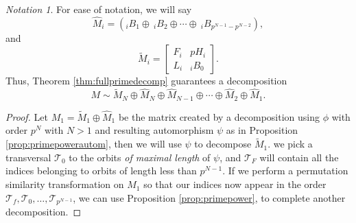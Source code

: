 \documentclass[preprint,12pt]{elsarticle}
\newcommand{\cT}{\mathcal{T}}
\newcommand{\hM}{\hat{M}}
\newcommand{\tM}{\tilde{M}}
\renewcommand{\so}{\mathscr{O}}
\theoremstyle{definition}
\theoremstyle{remark}
\newtheorem{notat}{Notation}
\newcommand{\afcomm}[1]{\textcolor{orange}{#1}}
\begin{document}
\begin{notat}
For ease of notation, we will say
\[\hM_i = \left(_iB_1 \oplus\ _iB_2 \oplus \cdots \oplus\ _iB_{p^{N-1}-p^{N-2}}\right),
\] and
\[
\tM_i =  \left[\begin{array}{rr} F_i & pH_i \\ L_i & _iB_0 \end{array}\right].
\]
Thus, Theorem \ref{thm:fullprimedecomp} guarantees a decomposition
\[
M \sim \tM_N \oplus \hM_N \oplus \hM_{N-1} \oplus \cdots \oplus \hM_2 \oplus \hM_1.
\]
\end{notat}
\begin{proof}

Let  $M_1 =  \tM_1 \oplus \hM_1$ be the matrix created by a decomposition using $\phi$ with order $p^N$ with $N>1$ and resulting automorphism $\psi$ as in Proposition \ref{prop:primepowerautom}, then we will use $\psi$ to decompose $\tM_1$. we pick a transversal $\cT_0$ to the orbits  \textit{of maximal length} of $\psi$, and $\cT_F$ will contain all the indices belonging to orbits of length less than $p^{N-1}$. If we perform a permutation similarity transformation on $M_1$ so that our indices now appear in the order $\cT_f, \cT_0, \ldots, \cT_{p^{N-1}}$, we can use Proposition \ref{prop:primepower}, to complete another decomposition.


\end{proof}
\end{document}
